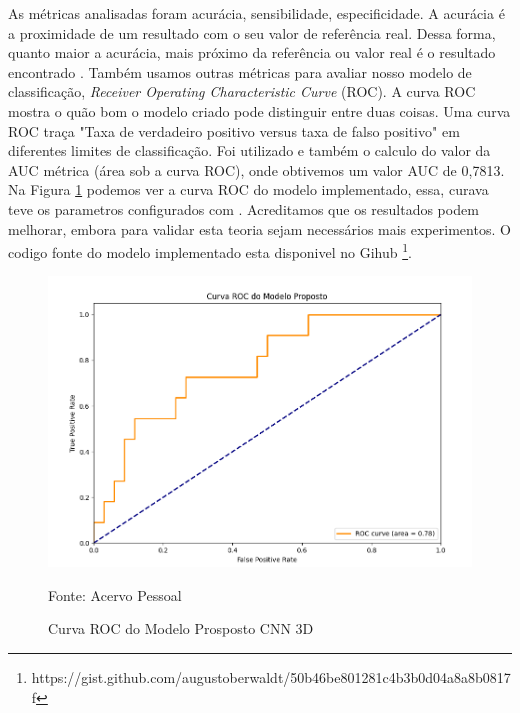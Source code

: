 \documentclass[openright]{UFRGS} %
\begin{document}
As métricas analisadas foram  acurácia, sensibilidade, especificidade. A acurácia é a proximidade de um resultado com o seu valor de referência real. Dessa forma, quanto maior a acurácia, mais próximo da referência ou valor real é o resultado encontrado \cite{monico2009acuracia}
. Também usamos outras métricas para avaliar nosso modelo de classificação, \textit{Receiver Operating Characteristic Curve} (ROC).
A curva ROC mostra o quão bom o modelo criado pode distinguir entre duas coisas.
Uma curva ROC traça "Taxa de verdadeiro positivo versus taxa de falso positivo"  em diferentes limites de classificação.
Foi utilizado e também o calculo do valor da AUC métrica (área sob a curva ROC), onde obtivemos um valor AUC de 0,7813. Na Figura  \ref{fig:rocCurve} podemos ver a curva ROC do modelo implementado, essa, curava teve os parametros configurados com .
Acreditamos que os resultados podem melhorar,
embora para validar esta teoria sejam necessários mais experimentos. O codigo fonte do modelo implementado esta disponivel no Gihub \footnote{
https://gist.github.com/augustoberwaldt/50b46be801281c4b3b0d04a8a8b0817f}.



\begin{figure}[h]
    \centering
    \caption{Curva ROC do Modelo Prosposto CNN 3D}
    \includegraphics[scale=0.40]{ROCCurvemodelopro.png}
    \centerline{Fonte: Acervo Pessoal}
    \label{fig:rocCurve}
\end{figure}
\end{document}
